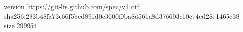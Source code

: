 version https://git-lfs.github.com/spec/v1
oid sha256:283b48fa73e66f5bcd891d0c3600f0ba8d561a8d376603c10c74cd2871465c38
size 299954
